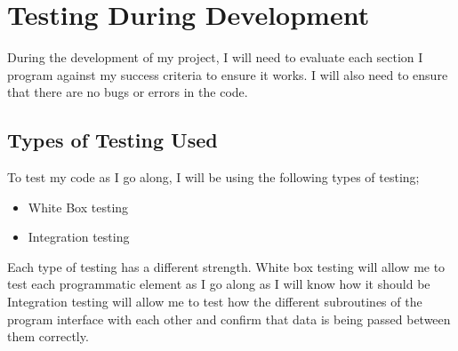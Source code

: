 \chapter{Testing During Development}
During the development of my project, I will need to evaluate each section I program against my success criteria to ensure it works. I will also need to ensure that there are no bugs or errors in the code.
\section{Types of Testing Used}
To test my code as I go along, I will be using the following types of testing;
\begin{itemize}
    \item White Box testing
    \item Integration testing
\end{itemize}
Each type of testing has a different strength. White box testing will allow me to test each programmatic element as I go along as I will know how it should be Integration testing will allow me to test how the different subroutines of the program interface with each other and confirm that data is being passed between them correctly.

